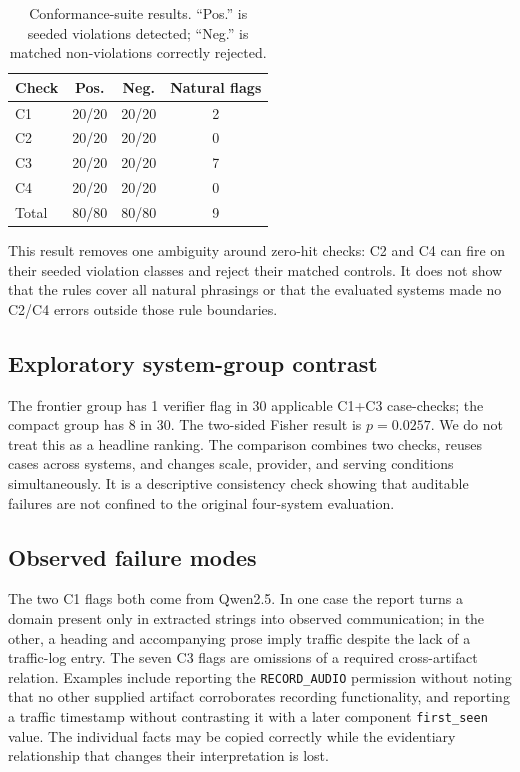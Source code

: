 \documentclass[conference]{IEEEtran}
\newcommand{\checkc}[1]{\textsc{#1}}
\begin{document}
\begin{table}[t]
\centering
\caption{Conformance-suite results. ``Pos.'' is seeded violations detected;
``Neg.'' is matched non-violations correctly rejected.}
\label{tab:fixtures}
\small
\begin{tabular}{lccc}
\toprule
Check & Pos. & Neg. & Natural flags \\
\midrule
C1 & 20/20 & 20/20 & 2 \\
C2 & 20/20 & 20/20 & 0 \\
C3 & 20/20 & 20/20 & 7 \\
C4 & 20/20 & 20/20 & 0 \\
\midrule
Total & 80/80 & 80/80 & 9 \\
\bottomrule
\end{tabular}
\end{table}

This result removes one ambiguity around zero-hit checks: C2 and C4 can fire on
their seeded violation classes and reject their matched controls. It does not
show that the rules cover all natural phrasings or that the evaluated systems
made no C2/C4 errors outside those rule boundaries.

\subsection{Exploratory system-group contrast}
The frontier group has 1 verifier flag in 30 applicable \checkc{C1}+\checkc{C3}
case-checks; the compact group has 8 in 30. The two-sided Fisher result is
$p=0.0257$. We do not treat this as a headline ranking. The comparison combines
two checks, reuses cases across systems, and changes scale, provider, and serving
conditions simultaneously. It is a descriptive consistency check showing that
auditable failures are not confined to the original four-system evaluation.

\subsection{Observed failure modes}
The two \checkc{C1} flags both come from Qwen2.5. In one case the report turns a
domain present only in extracted strings into observed communication; in the
other, a heading and accompanying prose imply traffic despite the lack of a
traffic-log entry. The seven \checkc{C3} flags are omissions of a required
cross-artifact relation. Examples include reporting the \texttt{RECORD\_AUDIO}
permission without noting that no other supplied artifact corroborates recording
functionality, and reporting a traffic timestamp without contrasting it with a
later component \texttt{first\_seen} value. The individual facts may be copied
correctly while the evidentiary relationship that changes their interpretation
is lost.
\end{document}

